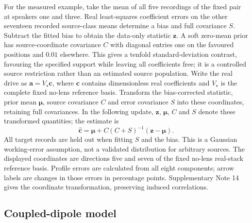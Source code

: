 \documentclass[lineno,pdflatex,sn-nature]{sn-jnl}%
\theoremstyle{thmstyleone}%
\theoremstyle{thmstyletwo}%
\theoremstyle{thmstylethree}%
\begin{document}
For the measured example, take the mean of all five recordings of the fixed pair at speakers one and three. Real least-squares coefficient errors on the other seventeen recorded source-class means determine a bias and full covariance $S$. Subtract the fitted bias to obtain the data-only statistic $\mathbf z$. A soft zero-mean prior has source-coordinate covariance $C$ with diagonal entries one on the favoured positions and $0.01$ elsewhere. This gives a tenfold standard-deviation contrast, favouring the specified support while leaving all coefficients free; it is a controlled source restriction rather than an estimated source population. Write the real drive as $\mathbf a=V_\star\mathbf c$, where $\mathbf c$ contains dimensionless real coefficients and $V_\star$ is the complete fixed no-lens reference basis. Transform the bias-corrected statistic, prior mean $\bm\mu$, source covariance $C$ and error covariance $S$ into these coordinates, retaining full covariances. In the following update, $\mathbf z$, $\bm\mu$, $C$ and $S$ denote these transformed quantities; the estimate is~\cite{stuart2010}
\begin{equation}
 \hat{\mathbf c}=\bm\mu+C(C+S)^{-1}(\mathbf z-\bm\mu).
\end{equation}
All target records are held out when fitting $S$ and the bias. This is a Gaussian working-error assumption, not a validated distribution for arbitrary sources. The displayed coordinates are directions five and seven of the fixed no-lens real-stack reference basis. Profile errors are calculated from all eight components; arrow labels are changes in those errors in percentage points. Supplementary Note 14 gives the coordinate transformation, preserving induced correlations.


\subsection{Coupled-dipole model}
\end{document}
